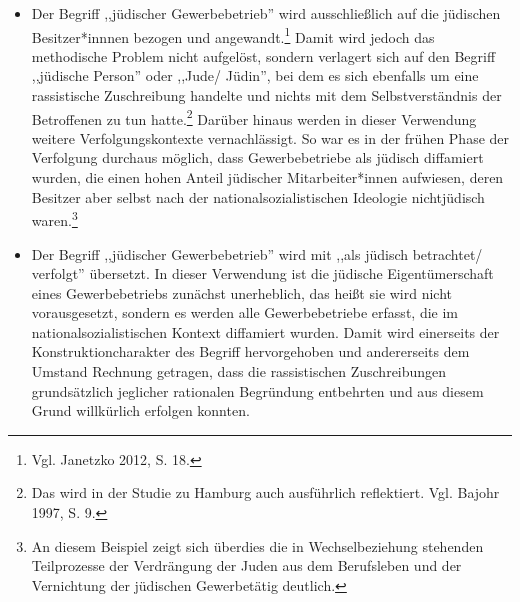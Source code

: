 \begin{itemize}
    \item Der Begriff ,,jüdischer Gewerbebetrieb'' wird ausschließlich auf die jüdischen Besitzer*innnen bezogen und angewandt.\footnote{Vgl. Janetzko 2012, S. 18.} Damit wird jedoch das methodische Problem nicht aufgelöst, sondern verlagert sich auf den Begriff ,,jüdische Person'' oder ,,Jude/ Jüdin'', bei dem es sich ebenfalls um eine rassistische Zuschreibung handelte und nichts mit dem Selbstverständnis der Betroffenen zu tun hatte.\footnote{Das wird in der Studie zu Hamburg auch ausführlich reflektiert. Vgl. Bajohr 1997, S. 9.} Darüber hinaus werden in dieser Verwendung weitere Verfolgungskontexte vernachlässigt. So war es in der frühen Phase der Verfolgung durchaus möglich, dass Gewerbebetriebe als jüdisch diffamiert wurden, die einen hohen Anteil jüdischer Mitarbeiter*innen aufwiesen, deren Besitzer aber selbst nach der nationalsozialistischen Ideologie nichtjüdisch waren.\footnote{An diesem Beispiel zeigt sich überdies die in Wechselbeziehung stehenden Teilprozesse der Verdrängung der Juden aus dem Berufsleben und der Vernichtung der jüdischen Gewerbetätig deutlich.}
    \item Der Begriff ,,jüdischer Gewerbebetrieb'' wird mit ,,als jüdisch betrachtet/ verfolgt'' übersetzt. In dieser Verwendung ist die jüdische Eigentümerschaft eines Gewerbebetriebs zunächst unerheblich, das heißt sie wird nicht vorausgesetzt, sondern es werden alle Gewerbebetriebe erfasst, die im nationalsozialistischen Kontext diffamiert wurden. Damit wird einerseits der Konstruktioncharakter des Begriff hervorgehoben und andererseits dem Umstand Rechnung getragen, dass die rassistischen Zuschreibungen grundsätzlich jeglicher rationalen Begründung entbehrten und aus diesem Grund willkürlich erfolgen konnten.
\end{itemize}

